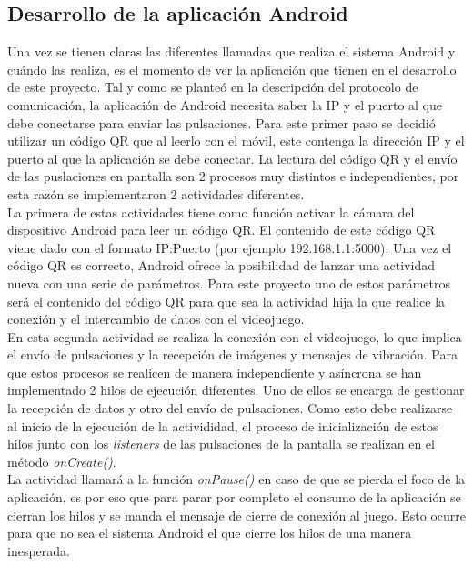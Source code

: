 \subsection {Desarrollo de la aplicaci\'on Android}

Una vez se tienen claras las diferentes llamadas que realiza el sistema Android y cu\'ando las realiza, es el momento de ver la aplicaci\'on que tienen en el desarrollo de este proyecto. Tal y como se plante\'o en la descripci\'on del protocolo de comunicaci\'on, la aplicaci\'on de Android necesita saber la IP y el puerto al que debe conectarse para enviar las pulsaciones. Para este primer paso se decidi\'o utilizar un c\'odigo QR que al leerlo con el m\'ovil, este contenga la direcci\'on IP y el puerto al que la aplicaci\'on se debe conectar. La lectura del c\'odigo QR y el env\'io de las puslaciones en pantalla son 2 procesos muy distintos e independientes, por esta raz\'on se implementaron 2 actividades diferentes.\\

La primera de estas actividades tiene como funci\'on activar la c\'amara del dispositivo Android para leer un c\'odigo QR. El contenido de este c\'odigo QR viene dado con el formato IP:Puerto (por ejemplo 192.168.1.1:5000). Una vez el c\'odigo QR es correcto, Android ofrece la posibilidad de lanzar una actividad nueva con una serie de par\'ametros. Para este proyecto uno de estos par\'ametros ser\'a el contenido del c\'odigo QR para que sea la actividad hija la que realice la conexi\'on y el intercambio de datos con el videojuego. \\

En esta segunda actividad se realiza la conexi\'on con el videojuego, lo que implica el env\'io de pulsaciones y la recepci\'on de im\'agenes y mensajes de vibraci\'on. Para que estos procesos se realicen de manera independiente y as\'incrona se han implementado 2 hilos de ejecuci\'on diferentes. Uno de ellos se encarga de gestionar la recepci\'on de datos y otro del env\'io de pulsaciones. Como esto debe realizarse al inicio de la ejecuci\'on de la activididad, el proceso de inicializaci\'on de estos hilos junto con los \textit{listeners} de las pulsaciones de la pantalla se realizan en el m\'etodo \textit{onCreate()}. \\

La actividad llamar\'a a la funci\'on \textit{onPause()} en caso de que se pierda el foco de la aplicaci\'on, es por eso que para parar por completo el consumo de la aplicaci\'on se cierran los hilos y se manda el mensaje de cierre de conexi\'on al juego. Esto ocurre para que no sea el sistema Android el que cierre los hilos de una manera inesperada.\\

